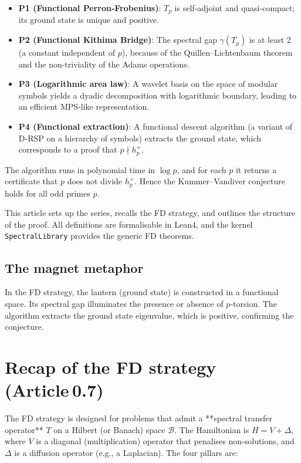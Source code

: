 \documentclass[11pt,a4paper]{article}
\begin{document}
\begin{itemize}
\item \textbf{P1 (Functional Perron‑Frobenius)}: $T_p$ is self‑adjoint and quasi‑compact; its ground state is unique and positive.
\item \textbf{P2 (Functional Kithima Bridge)}: The spectral gap $\gamma(T_p)$ is at least $2$ (a constant independent of $p$), because of the Quillen–Lichtenbaum theorem and the non‑triviality of the Adams operations.
\item \textbf{P3 (Logarithmic area law)}: A wavelet basis on the space of modular symbols yields a dyadic decomposition with logarithmic boundary, leading to an efficient MPS‑like representation.
\item \textbf{P4 (Functional extraction)}: A functional descent algorithm (a variant of D‑RSP on a hierarchy of symbols) extracts the ground state, which corresponds to a proof that $p \nmid h_p^+$.
\end{itemize}

The algorithm runs in polynomial time in $\log p$, and for each $p$ it returns a certificate that $p$ does not divide $h_p^+$. Hence the Kummer–Vandiver conjecture holds for all odd primes $p$.

This article sets up the series, recalls the FD strategy, and outlines the structure of the proof. All definitions are formalisable in Lean4, and the kernel \texttt{SpectralLibrary} provides the generic FD theorems.

\subsection{The magnet metaphor}

In the FD strategy, the lantern (ground state) is constructed in a functional space. Its spectral gap illuminates the presence or absence of $p$‑torsion. The algorithm extracts the ground state eigenvalue, which is positive, confirming the conjecture.

\section{Recap of the FD strategy (Article 0.7)}

The FD strategy is designed for problems that admit a **spectral transfer operator** $T$ on a Hilbert (or Banach) space $\mathcal{B}$. The Hamiltonian is $H = V + \Delta$, where $V$ is a diagonal (multiplication) operator that penalises non‑solutions, and $\Delta$ is a diffusion operator (e.g., a Laplacian). The four pillars are:
\end{document}
